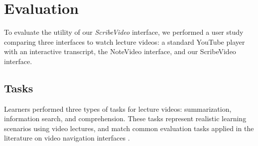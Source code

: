 \section{Evaluation}
To evaluate the utility of our \textit{ScribeVideo} interface, we performed a user study comparing three interfaces to watch lecture videos: a standard YouTube player with an interactive transcript, the NoteVideo interface, and our ScribeVideo interface.  

\subsection{Tasks}
Learners performed three types of tasks for lecture videos: summarization, information search, and comprehension. These tasks represent realistic learning scenarios using video lectures, and match common evaluation tasks applied in the literature on video navigation interfaces \cite{}.
